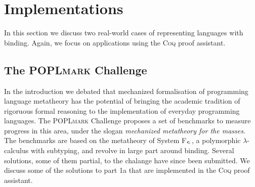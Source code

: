 \documentclass[a4paper,11pt]{article}
\newcommand{\name}[1]{\textsc{#1}\xspace}
\def\Coq{\name{Coq}}
\def\POPLmark{\name{POPLmark}}
\begin{document}
\section{Implementations}

In this section we discuss two real-world cases of representing
languages with binding. Again, we focus on applications using the \Coq
proof assistant.


\subsection{The \POPLmark Challenge}

In the introduction we debated that mechanized formalisation of
programming language metatheory has the potential of bringing the
academic tradition of rigoruous formal reasoning to the implementation
of everyday programming languages.
The \POPLmark Challenge \cite{poplmark-challenge-05} proposes a set of
benchmarks to measure progress in this area, under the slogan {\em
  mechanized metatheory for the masses}.
The benchmarks are based on the metatheory of System
F$_\texttt{<\!:}$, a polymorphic $\lambda$-calculus with subtyping,
and revolve in large part around binding.
Several solutions, some of them partial, to the chalange have since
been submitted. We discuss some of the solutions to part 1a that are
implemented in the \Coq proof assistant.
\end{document}
